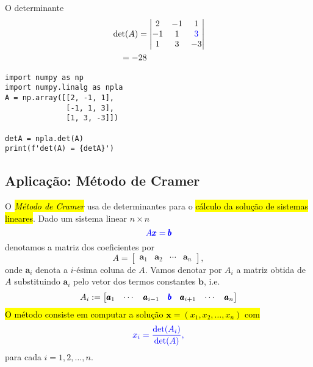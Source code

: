 \begin{ex}
  O determinante
  \begin{align}
    & \det(A) =
              \begin{vmatrix}
                2 & -1 & 1\\
                -1 & 1 & {\color{blue}3}\\
                1 & 3 & -3
              \end{vmatrix}\\
    & \text{}\quad = -28
  \end{align}

\begin{lstlisting}
import numpy as np
import numpy.linalg as npla
A = np.array([[2, -1, 1],
              [-1, 1, 3],
              [1, 3, -3]])

detA = npla.det(A)
print(f'det(A) = {detA}')
\end{lstlisting}

\end{ex}

\subsection{Aplicação: Método de Cramer}

O \hl{\emph{Método de Cramer}}{\cramer} usa de determinantes para o \hl{cálculo da solução de sistemas lineares}. Dado um sistema linear $n\times n$
\begin{equation}\color{blue}A\pmb{x} = \pmb{b}
\end{equation}
denotamos a matriz dos coeficientes por
\begin{equation}
  A =
  \begin{bmatrix}
    \pmb{a}_1 & \pmb{a}_2 & \cdots & \pmb{a}_n
\end{bmatrix},
\end{equation}
onde $\pmb{a}_i$ denota a $i$-ésima coluna de $A$. Vamos denotar por $A_i$ a matriz obtida de $A$ substituindo $\pmb{a}_i$ pelo vetor dos termos constantes $\pmb{b}$, i.e.
\begin{equation}
  A_i :=
  \begin{bmatrix}
    \pmb{a}_1 & \cdots & \pmb{a}_{i-1} & {\color{blue}\pmb{b}} & \pmb{a}_{i+1} & \cdots & \pmb{a}_n
  \end{bmatrix}
\end{equation}
\hl{O método consiste em computar a solução $\pmb{x} = (x_1, x_2, \ldots, x_n)$ com}
\begin{equation}\color{blue}x_i = \frac{\det(A_i)}{\det(A)},
\end{equation}
para cada $i = 1, 2, \dotsc, n$.

